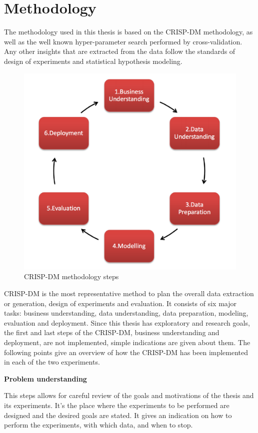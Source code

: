 \newpage
\section{Methodology}

The methodology used in this thesis is based on the CRISP-DM methodology, as well as the well known hyper-parameter search performed by cross-validation. Any other insights that are extracted from the data follow the standards of design of experiments and statistical hypothesis modeling.

\begin{figure}[H]
    \centering
        \includegraphics[width=0.6\linewidth]{img/crisp-dm.png}
    \caption{CRISP-DM methodology steps}\label{fig:crisp}
\end{figure}


CRISP-DM is the most representative method to plan the overall data extraction or generation, design of experiments and evaluation. It consists of six major tasks: business understanding, data understanding, data preparation, modeling, evaluation and deployment. Since this thesis has exploratory and research goals, the first and last steps of the CRISP-DM, business understanding and deployment, are not implemented, simple indications are given about them. The following points give an overview of how the CRISP-DM has been implemented in each of the two experiments.

\textbf{Problem understanding}

This steps allows for careful review of the goals and motivations of the thesis and its experiments. It's the place where the experiments to be performed are designed and the desired goals are stated. It gives an indication on how to perform the experiments, with which data, and when to stop.


